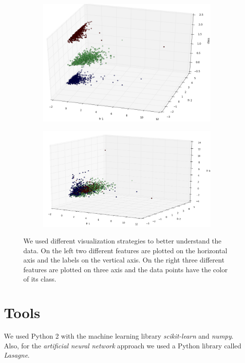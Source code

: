 \documentclass[a4paper, 11pt]{article}
\begin{document}
\begin{figure}[!b!]
 \centering 
\begin{subfigure}[b]{0.4\textwidth}
	\centering
	\includegraphics[width=\textwidth]{2_features.png} 
	\caption{}
	\label{2Features}
\end{subfigure}
\hfill
\begin{subfigure}[b]{0.4\textwidth}
	\centering
	\includegraphics[width=\textwidth]{3_features.png} 
	\caption{}
	\label{3Features}
\end{subfigure}
\caption{We used different visualization strategies to better understand the data. On the left two different features are plotted on the horizontal axis and the labels on the vertical axis. On the right three different features are plotted on three axis and the data points have the color of its class.}
\end{figure}

\section{Tools}
We used Python 2 with the machine learning library \textit{scikit-learn} and \textit{numpy}. Also, for the \textit{artificial neural network} approach we used a Python library called \textit{Lasagne}.
\end{document}
